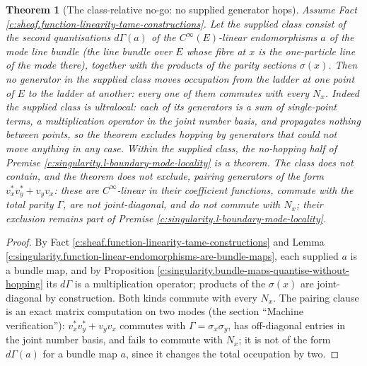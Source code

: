 \documentclass[11pt]{article}
\newtheorem{theorem}{Theorem}[section]
\theoremstyle{definition}
\theoremstyle{plain}
\begin{document}
\begin{theorem}[The class-relative no-go: no supplied generator hops]\label{c:singularity.class-relative-no-go-no-supplied}
Assume Fact \ref{c:sheaf.function-linearity-tame-constructions}. Let the \emph{supplied class} consist of the second quantisations $d\Gamma(a)$ of the $C^\infty(E)$-linear endomorphisms $a$ of the mode line bundle (the line bundle over $E$ whose fibre at $x$ is the one-particle line of the mode there), together with the products of the parity sections $\sigma(x)$. Then no generator in the supplied class moves occupation from the ladder at one point of $E$ to the ladder at another: every one of them commutes with every $N_x$. Indeed the supplied class is \emph{ultralocal}: each of its generators is a sum of single-point terms, a multiplication operator in the joint number basis, and propagates nothing between points, so the theorem excludes hopping by generators that could not move anything in any case. Within the supplied class, the no-hopping half of Premise \ref{c:singularity.l-boundary-mode-locality} is a theorem. The class does not contain, and the theorem does not exclude, pairing generators of the form $v^{*}_x v^{*}_y + v_y v_x$: these are $C^\infty$-linear in their coefficient functions, commute with the total parity $\Gamma$, are not joint-diagonal, and do not commute with $N_x$; their exclusion remains part of Premise \ref{c:singularity.l-boundary-mode-locality}.
\end{theorem}
\begin{proof}
By Fact \ref{c:sheaf.function-linearity-tame-constructions} and Lemma \ref{c:singularity.function-linear-endomorphisms-are-bundle-maps}, each supplied $a$ is a bundle map, and by Proposition \ref{c:singularity.bundle-maps-quantise-without-hopping} its $d\Gamma$ is a multiplication operator; products of the $\sigma(x)$ are joint-diagonal by construction. Both kinds commute with every $N_x$. The pairing clause is an exact matrix computation on two modes (the section ``Machine verification''): $v^{*}_x v^{*}_y + v_y v_x$ commutes with $\Gamma = \sigma_x\sigma_y$, has off-diagonal entries in the joint number basis, and fails to commute with $N_x$; it is not of the form $d\Gamma(a)$ for a bundle map $a$, since it changes the total occupation by two.

\end{proof}
\end{document}
